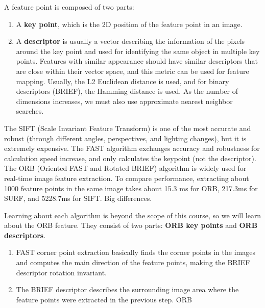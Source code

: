 \documentclass{article}
\newcounter{algo}[section]
\begin{document}
  A feature point is composed of two parts: 
  \begin{enumerate}
      \item A \textbf{key point}, which is the 2D position of the feature point in an image. 
      \item A \textbf{descriptor} is usually a vector describing the information of the pixels around the key point and used for identifying the same object in multiple key points. Features with similar appearance should have similar descriptors that are close within their vector space, and this metric can be used for feature mapping. Usually, the L2 Euclidean distance is used, and for binary descriptors (BRIEF), the Hamming distance is used. As the number of dimensions increases, we must also use approximate nearest neighbor searches. 
  \end{enumerate}

  The SIFT (Scale Invariant Feature Transform) is one of the most accurate and robust (through different angles, perspectives, and lighting changes), but it is extremely expensive. The FAST algorithm exchanges accuracy and robustness for calculation speed increase, and only calculates the keypoint (not the descriptor). The ORB (Oriented FAST and Rotated BRIEF) algorithm is widely used for real-time image feature extraction. To compare performance, extracting about 1000 feature points in the same image takes about 15.3 ms for ORB, 217.3ms for SURF, and 5228.7ms for SIFT. Big differences. 

  Learning about each algorithm is beyond the scope of this course, so we will learn about the ORB feature. They consist of two parts: \textbf{ORB key points} and \textbf{ORB descriptors}. 
  \begin{enumerate}
      \item FAST corner point extraction basically finds the corner points in the images and computes the main direction of the feature points, making the BRIEF descriptor rotation invariant. 
      \item The BRIEF descriptor describes the surrounding image area where the feature points were extracted in the previous step. ORB 
  \end{enumerate}
\end{document}
